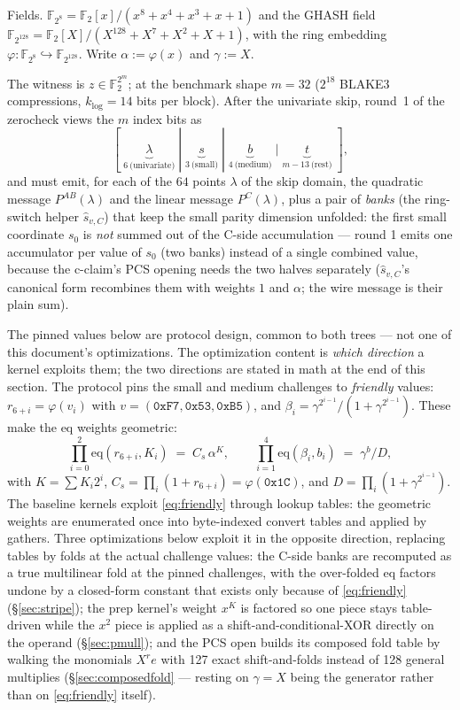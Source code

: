 \documentclass[11pt]{article}
\newcommand{\Ftwo}{\mathbb{F}_2}
\newcommand{\Feight}{\mathbb{F}_{2^8}}
\newcommand{\Fbig}{\mathbb{F}_{2^{128}}}
\newcommand{\eq}{\mathrm{eq}}
\begin{document}
Fields. $\Feight = \Ftwo[x]/(x^8+x^4+x^3+x+1)$ and the GHASH field
$\Fbig = \Ftwo[X]/(X^{128}+X^7+X^2+X+1)$, with the ring embedding
$\varphi:\Feight\hookrightarrow\Fbig$. Write $\alpha := \varphi(x)$ and
$\gamma := X$.

The witness is $z\in\Ftwo^{2^m}$; at the benchmark shape $m=32$
($2^{18}$ BLAKE3 compressions, $k_{\log}=14$ bits per block). After the
univariate skip, round~1 of the zerocheck views the $m$ index bits as
\[
[\;\underbrace{\lambda}_{6\ \text{(univariate)}}\;|\;
 \underbrace{s}_{3\ \text{(small)}}\;|\;
 \underbrace{b}_{4\ \text{(medium)}}\;|\;
 \underbrace{t}_{m-13\ \text{(rest)}}\;],
\]
and must emit, for each of the $64$ points $\lambda$ of the skip domain, the
quadratic message $P^{AB}(\lambda)$ and the linear message $P^{C}(\lambda)$,
plus a pair of \emph{banks} (the ring-switch helper $\hat s_{v,C}$) that keep
the small parity dimension unfolded: the first small coordinate $s_0$ is
\emph{not} summed out of the C-side accumulation --- round 1 emits one
accumulator per value of $s_0$ (two banks) instead of a single combined
value, because the c-claim's PCS opening needs the two halves separately
($\hat s_{v,C}$'s canonical form recombines them with weights $1$ and
$\alpha$; the wire message is their plain sum).

The pinned values below are protocol design, common to both trees --- not
one of this document's optimizations. The optimization content is
\emph{which direction} a kernel exploits them; the two directions are
stated in math at the end of this section.
The protocol pins the small and medium challenges to \emph{friendly} values:
$r_{6+i} = \varphi(v_i)$ with $v=(\mathtt{0xF7},\mathtt{0x53},\mathtt{0xB5})$,
and $\beta_i = \gamma^{2^{i-1}}/(1+\gamma^{2^{i-1}})$. These make the eq
weights geometric:
\begin{equation}
\prod_{i=0}^{2}\eq(r_{6+i},K_i) \;=\; C_s\,\alpha^{K},
\qquad
\prod_{i=1}^{4}\eq(\beta_i,b_i) \;=\; \gamma^{b}/D,
\label{eq:friendly}
\end{equation}
with $K=\sum K_i 2^i$, $C_s=\prod_i(1+r_{6+i})=\varphi(\mathtt{0x1C})$, and
$D=\prod_i(1+\gamma^{2^{i-1}})$. The baseline kernels exploit
\eqref{eq:friendly} through lookup tables: the geometric weights are
enumerated once into byte-indexed convert tables and applied by gathers.
Three optimizations below exploit it in the opposite direction, replacing
tables by folds at the actual challenge values: the C-side banks are
recomputed as a true multilinear fold at the pinned challenges, with the
over-folded eq factors undone by a closed-form constant that exists only
because of \eqref{eq:friendly} (\S\ref{sec:stripe}); the prep kernel's
weight $x^K$ is factored so one piece stays table-driven while the $x^2$
piece is applied as a shift-and-conditional-XOR directly on the operand
(\S\ref{sec:pmull}); and the PCS open builds its composed fold table by
walking the monomials $X^r e$ with 127 exact shift-and-folds instead of 128
general multiplies (\S\ref{sec:composedfold} --- resting on $\gamma = X$
being the generator rather than on \eqref{eq:friendly} itself).
\end{document}
